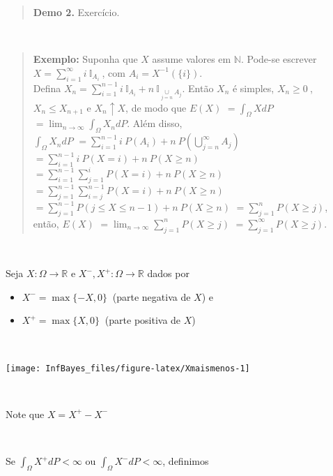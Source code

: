 \documentclass[
]{book}
\begin{document}
\begin{quote}
\textbf{Demo 2.} Exercício.
\end{quote}

\(~\)

\begin{quote}
\textbf{Exemplo:} Suponha que \(X\) assume valores em \(\mathbb{N}\). Pode-se escrever \(X =\displaystyle\sum_{i=1}^\infty i ~\mathbb{I}_{A_i}~\), com \(A_i = X^{-1}\left(\{i\}\right)\).\\
Defina \(X_n =\displaystyle\sum_{i=1}^{n-1} i ~\mathbb{I}_{A_i}+n~\mathbb{I}_{\underset{j=n}{\cup} A_j}\). Então \(X_n\) é simples, \(X_n \geq 0~\), \(X_n \leq X_{n+1}\) e \(X_n \uparrow X\), de modo que \(E(X)\) \(=\displaystyle\int_\Omega X dP\) \(=\displaystyle\lim_{n \rightarrow\infty}\int_\Omega X_n dP\). Além disso,\\
\(\displaystyle\int_\Omega X_n dP\) \(=\displaystyle\sum_{i=1}^{n-1} i~P(A_i) + n~P\left(\bigcup_{j=n}^{\infty} A_j\right)\) \(=\displaystyle\sum_{i=1}^{n-1}i~P(X = i) + n~P(X \geq n)\) \(=\displaystyle\sum_{i=1}^{n-1} \sum_{j=1}^{i} P(X = i) + n~P(X \geq n)\) \(\displaystyle=\sum_{j=1}^{n-1} \sum_{i=j}^{n-1} P(X = i) + n~P(X \geq n)\) \(=\displaystyle\sum_{j=1}^{n-1}P(j \leq X \leq n-1) + n~P(X \geq n)\) \(=\displaystyle\sum_{j=1}^n P(X \geq j)\),\\
então, \(E(X)\) \(\displaystyle=\lim_{n\rightarrow \infty}\sum_{j=1}^nP(X \geq j)\) \(\displaystyle=\sum_{j=1}^{\infty}P(X \geq j)\).
\end{quote}

\(~\)

Seja \(X: \Omega \longrightarrow \mathbb{R}\) e \(X^-,X^+: \Omega \longrightarrow \mathbb{R}\) dados por

\begin{itemize}
\item
  \(X^- = \max\{-X,0\}~\) (parte negativa de \(X\)) e
\item
  \(X^+ = \max\{X,0\}~\) (parte positiva de \(X\))
\end{itemize}

\(~\)

\begin{center}\texttt{[image: InfBayes\_files/figure-latex/Xmaismenos-1]} \end{center}

\(~\)

Note que \(X = X^+ - X^-\)

\(~\)

Se \(\displaystyle\int_\Omega X^+ dP < \infty\) ou \(\displaystyle\int_\Omega X^- dP < \infty\), definimos
\end{document}
